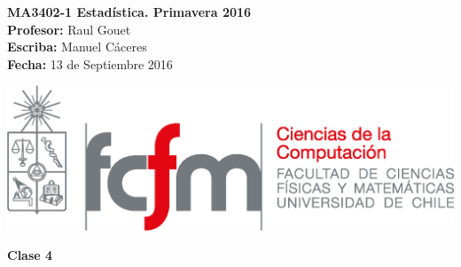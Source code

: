 \documentclass[10pt]{article}
\theoremstyle{plain}
\theoremstyle{definition}
\newcommand{\catnum}{4} %
\newcommand{\fecha}{13 de Septiembre 2016 }
\begin{document}
\vspace*{-1.2 cm}
\begin{minipage}{0.6\textwidth}
\begin{flushleft}
\hspace*{-0.5cm}\textbf{MA3402-1 Estadística. Primavera 2016}\\
\hspace*{-0.5cm}\textbf{Profesor:} Raul Gouet\\
\hspace*{-0.5cm}\textbf{Escriba:} Manuel Cáceres\\
\hspace*{-0.5cm}\textbf{Fecha:} \fecha
\end{flushleft}
\end{minipage}
\begin{minipage}{0.36\textwidth}
\begin{flushright}
\includegraphics[scale=0.3]{imagenes/fcfm_dcc}
\end{flushright}
\end{minipage}
\bigskip

\begin{center}
\LARGE\textbf{Clase \catnum}
\end{center}
\end{document}
